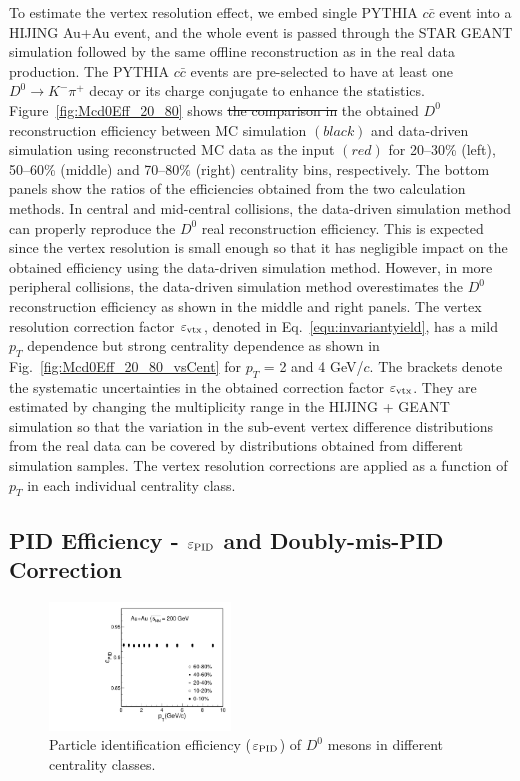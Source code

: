 \documentclass[%
 reprint,	
showpacs,
 amsmath,amssymb,
 aps,
 prc,
]{revtex4-1}
\providecommand{\DIFaddtex}[1]{{\protect\color{blue}\uwave{#1}}} %
\providecommand{\DIFdeltex}[1]{{\protect\color{red}\sout{#1}}}                      %
\providecommand{\DIFaddbegin}{} %
\providecommand{\DIFaddend}{} %
\providecommand{\DIFdelbegin}{} %
\providecommand{\DIFdelend}{} %
\providecommand{\DIFadd}[1]{\texorpdfstring{\DIFaddtex{#1}}{#1}} %
\providecommand{\DIFdel}[1]{\texorpdfstring{\DIFdeltex{#1}}{}} %
\begin{document}
To estimate the vertex resolution effect, we embed single PYTHIA $c\bar{c}$ event into a HIJING Au+Au event, and the whole event is passed through the STAR GEANT simulation followed by the same offline reconstruction as in the real data production. The PYTHIA $c\bar{c}$ events are pre-selected to have at least one $D^0\rightarrow K^-\pi^+$ decay or its charge conjugate to enhance the statistics. Figure~\ref{fig:Mcd0Eff_20_80} shows \DIFdelbegin \DIFdel{the comparison in }\DIFdelend \DIFaddbegin \DIFadd{a comparison of }\DIFaddend the obtained $D^0$ reconstruction efficiency between MC simulation $(black)$ and data-driven simulation using reconstructed MC data as the input $(red)$ for 20--30\% (left), 50--60\% (middle) and 70--80\% (right) centrality bins, respectively. The bottom panels show the ratios of the efficiencies obtained from the two calculation methods. In central and mid-central collisions, the data-driven simulation method can properly reproduce the $D^0$ real reconstruction efficiency. This is expected since the vertex resolution is small enough so that it has negligible impact on the obtained efficiency using the data-driven simulation method. However, in more peripheral collisions, the data-driven simulation method overestimates the $D^0$ reconstruction efficiency as shown in the middle and right panels. The vertex resolution correction factor $\varepsilon_{\rm vtx}$, denoted in Eq.~\ref{equ:invariantyield}, has a mild $p_{T}$ dependence but strong centrality dependence as shown in Fig.~\ref{fig:Mcd0Eff_20_80_vsCent} for $p_T$ = 2 and 4 GeV/$c$. The brackets denote the systematic uncertainties in the obtained correction factor $\varepsilon_{\rm vtx}$. They are estimated by changing the multiplicity range in the HIJING + GEANT simulation so that the variation in the sub-event vertex difference distributions from the real data can be covered by distributions obtained from different simulation samples. The vertex resolution corrections are applied as a function of $p_{T}$ in each individual centrality class.

\subsection{PID Efficiency - $\varepsilon_{\rm PID}$ and Doubly-mis-PID Correction}
\label{correction:PID}

\begin{figure}
\centering
\includegraphics[width=0.43\textwidth]{fig/Datad0Eff_pid_10.pdf}
\caption{Particle identification efficiency ($\varepsilon_{\rm PID}$) of $D^0$ mesons in different centrality classes.}
\label{fig:Datad0Eff_pid} 
\end{figure}
\end{document}
